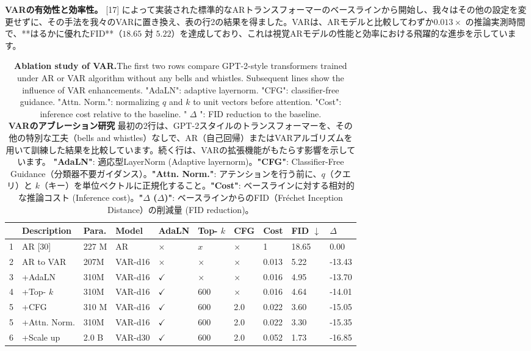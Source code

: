 \documentclass{article}
\begin{document}
\textbf{VARの有効性と効率性。}
[17] によって実装された標準的なARトランスフォーマーのベースラインから開始し、我々はその他の設定を変更せずに、その手法を我々のVARに置き換え、表の行2の結果を得ました。VARは、ARモデルと比較してわずか$0.013 \times$ の推論実測時間で、**はるかに優れたFID**（$18.65$ 対 $5.22$）を達成しており、これは視覚ARモデルの性能と効率における飛躍的な進歩を示しています。


\begin{table}[h]
\begin{center}
\caption{\textbf{Ablation study of VAR.}The first two rows compare GPT-2-style transformers trained under AR or VAR algorithm without any bells and whistles. Subsequent lines show the influence of VAR enhancements. "AdaLN": adaptive layernorm. "CFG": classifier-free guidance. "Attn. Norm.": normalizing $q$ and $k$ to unit vectors before attention. "Cost": inference cost relative to the baseline. " $\Delta$ ": FID reduction to the baseline.
\\
\textbf{VARのアブレーション研究}
最初の2行は、GPT-2スタイルのトランスフォーマーを、その他の特別な工夫（bells and whistles）なしで、AR（自己回帰）またはVARアルゴリズムを用いて訓練した結果を比較しています。続く行は、VARの拡張機能がもたらす影響を示しています。
\textbf{"AdaLN"}: 適応型LayerNorm (Adaptive layernorm)。\textbf{"CFG"}: Classifier-Free Guidance（分類器不要ガイダンス）。\textbf{"Attn. Norm."}: アテンションを行う前に、$q$（クエリ）と $k$（キー）を単位ベクトルに正規化すること。\textbf{"Cost"}: ベースラインに対する相対的な推論コスト (Inference cost)。\textbf{"$\Delta$ ($\Delta$)"}: ベースラインからのFID（Fréchet Inception Distance）の削減量 (FID reduction)。
}
\begin{tabular}{|l|l|l|l|l|l|l|l|l|l|}
\hline
 & Description & Para. & Model & AdaLN & Top- $k$ & CFG & Cost & FID $\downarrow$ & $\Delta$ \\
\hline
1 & AR [30] & 227 M & AR & $\times$ & $x$ & $\times$ & 1 & 18.65 & 0.00 \\
\hline
2 & AR to VAR & 207M & VAR-d16 & $\times$ & $\times$ & $\times$ & 0.013 & 5.22 & -13.43 \\
\hline
3 & +AdaLN & 310M & VAR-d16 & $\checkmark$ & $\times$ & $\times$ & 0.016 & 4.95 & -13.70 \\
\hline
4 & +Top- $k$ & 310M & VAR-d16 & $\checkmark$ & 600 & $\times$ & 0.016 & 4.64 & -14.01 \\
\hline
5 & +CFG & 310 M & VAR-d16 & $\checkmark$ & 600 & 2.0 & 0.022 & 3.60 & -15.05 \\
\hline
5 & +Attn. Norm. & 310M & VAR-d16 & $\checkmark$ & 600 & 2.0 & 0.022 & 3.30 & -15.35 \\
\hline
6 & +Scale up & 2.0 B & VAR-d30 & $\checkmark$ & 600 & 2.0 & 0.052 & 1.73 & -16.85 \\
\hline
\end{tabular}
\end{center}
\end{table}
\end{document}
